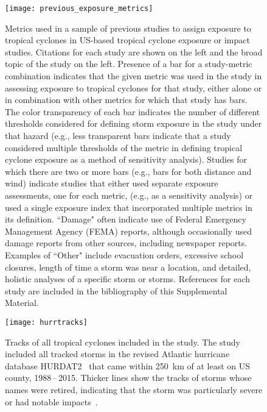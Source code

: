\documentclass[11pt, titlepage, twoside]{article}
\begin{document}
\begin{figure}[tbhp!]
\centering
\texttt{[image: previous\_exposure\_metrics]}
\caption{Metrics used in a sample of previous studies to assign exposure to
tropical cyclones in \ac{US}-based tropical cyclone exposure or impact studies.
Citations for each study are shown on the left and the broad topic of the study
on the left. Presence of a bar for a study-metric combination indicates that
the given metric was used in the study in assessing exposure to tropical
cyclones for that study, either alone or in combination with other metrics for
which that study has bars. The color transparency of each bar indicates the
number of different thresholds considered for defining storm exposure in the
study under that hazard (e.g., less transparent bars indicate that a study
considered multiple thresholds of the metric in defining tropical cyclone
exposure as a method of sensitivity analysis). Studies for which there are two
or more bars (e.g., bars for both distance and wind) indicate studies that
either used separate exposure assessments, one for each metric, (e.g., as a
sensitivity analysis) or used a single exposure index that incorporated
multiple metrics in its definition. ``Damage" often indicate use of Federal
Emergency Management Agency (FEMA) reports, although occasionally used damage
reports from other sources, including newspaper reports. Examples of ``Other"
include evacuation orders, excessive school closures, length of time a storm
was near a location, and detailed, holistic analyses of a specific storm or
storms. References for each study are included in the bibliography of this
Supplemental Material.}
\label{fig:previousmetrics}
\end{figure}

\nocite{logan2015, gares2014, esnard2011, zandbergen2009, horney2016,
grabich2016, antipova2015post, zahran2010, currie2013, grabich2015,
grabich2016hurricane, amstadter2010, acierno2006, le2013, lieberman2017,
mckinney2011, dosa2012evacuate, swerdel2014, czajkowski2011, mongin2017,
kessler2007hurricane, caillouet2008increase, rosenheim2018disaster,
domino2003disasters, kim2016, kinney2008, kim2015, tansel2010, escobedo2009,
fuller2014, baggerly2008impact, strobl2011economic, mukherjee2017}

\newpage

\begin{figure}[tbhp!]
\centering
\texttt{[image: hurrtracks]}
\caption{Tracks of all tropical cyclones included in the study. The study
included all tracked storms in the revised Atlantic hurricane database
\ac{HURDAT2}~\parencite{landsea2013} that came within 250~\si{\kilo\metre} of at least on
\ac{US} county, 1988\,--\,2015. Thicker lines show the tracks of storms whose
names were retired, indicating that the storm was particularly severe or had
notable impacts~\parencite{retirednames}.}
\label{fig:hurrtracks}
\end{figure}
\end{document}
